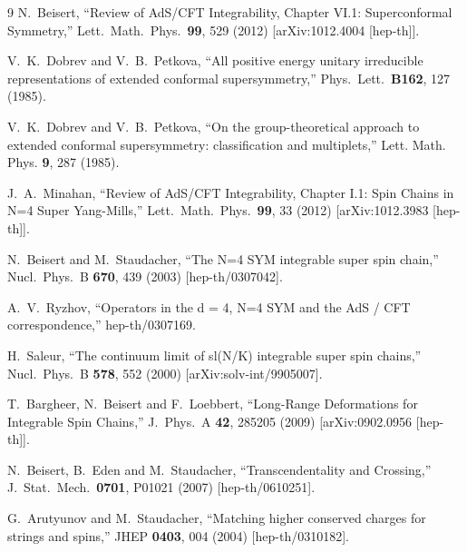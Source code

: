\documentclass[a4paper,11pt]{article}
\numberwithin{equation}{section}
\begin{document}
\begin{thebibliography} {9}
  N.~Beisert,
  ``Review of AdS/CFT Integrability, Chapter VI.1: Superconformal Symmetry,''
  Lett.\ Math.\ Phys.\  {\bf 99}, 529 (2012)
  [arXiv:1012.4004 [hep-th]].

	V.~K.~Dobrev and V.~B.~Petkova, 
	``All positive energy unitary irreducible representations of extended conformal supersymmetry,''
	Phys.\ Lett.\ {\bf B162}, 127 (1985).

	V.~K.~Dobrev and V.~B.~Petkova,
	``On the group-theoretical approach to extended conformal supersymmetry: classification and multiplets,''
	Lett. Math. Phys. {\bf 9}, 287 (1985).

  J.~A.~Minahan,
  ``Review of AdS/CFT Integrability, Chapter I.1: Spin Chains in N=4 Super Yang-Mills,''
  Lett.\ Math.\ Phys.\  {\bf 99}, 33 (2012)
  [arXiv:1012.3983 [hep-th]].

  N.~Beisert and M.~Staudacher,
  ``The N=4 SYM integrable super spin chain,''
  Nucl.\ Phys.\ B {\bf 670}, 439 (2003)
  [hep-th/0307042].

  A.~V.~Ryzhov,
  ``Operators in the d = 4, N=4 SYM and the AdS / CFT correspondence,''
  hep-th/0307169.

	H.~Saleur, 
	``The continuum limit of sl(N/K) integrable super spin chains,'' 
	Nucl.\ Phys.\ B {\bf 578}, 552 (2000) 
	[arXiv:solv-int/9905007].

  T.~Bargheer, N.~Beisert and F.~Loebbert,
  ``Long-Range Deformations for Integrable Spin Chains,''
  J.\ Phys.\ A {\bf 42}, 285205 (2009)
  [arXiv:0902.0956 [hep-th]].

  N.~Beisert, B.~Eden and M.~Staudacher,
  ``Transcendentality and Crossing,''
  J.\ Stat.\ Mech.\  {\bf 0701}, P01021 (2007)
  [hep-th/0610251].

  G.~Arutyunov and M.~Staudacher,
  ``Matching higher conserved charges for strings and spins,''
  JHEP {\bf 0403}, 004 (2004)
  [hep-th/0310182].


\end{thebibliography}
\end{document}

